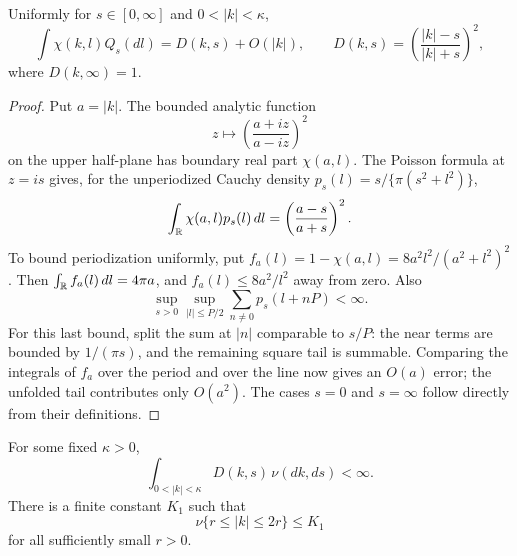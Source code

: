 \begin{lemma}
\label{lem:angular-poisson}
Uniformly for \(s\in[0,\infty]\) and \(0<|k|<\kappa\),
\begin{equation}
 \label{eq:angular-poisson}
 \int\chi(k,l)Q_s(dl)
   =D(k,s)+O(|k|),\qquad
 D(k,s)=\left(\frac{|k|-s}{|k|+s}\right)^2,
\end{equation}
where \(D(k,\infty)=1\).
\end{lemma}

\begin{proof}
Put \(a=|k|\). The bounded analytic function
\[
 z\longmapsto\left(\frac{a+iz}{a-iz}\right)^2
\]
on the upper half-plane has boundary real part \(\chi(a,l)\).
The Poisson formula at \(z=is\) gives, for the unperiodized Cauchy density
\(p_s(l)=s/\{\pi(s^2+l^2)\}\),
\[
 \int_\mathbb R\chi(a,l)p_s(l)\,dl
       =\left(\frac{a-s}{a+s}\right)^2.
\]
To bound periodization uniformly, put
\(f_a(l)=1-\chi(a,l)=8a^2l^2/(a^2+l^2)^2\). Then
\(\int_\mathbb R f_a(l)\,dl=4\pi a\), and
\(f_a(l)\le 8a^2/l^2\) away from zero. Also
\[
 \sup_{s>0}\sup_{|l|\le P/2}\sum_{n\ne0}p_s(l+nP)<\infty.
\]
For this last bound, split the sum at \(|n|\) comparable to \(s/P\): the
near terms are bounded by \(1/(\pi s)\), and the remaining square tail is
summable. Comparing the integrals of \(f_a\) over the period and over the
line now gives an \(O(a)\) error; the unfolded tail contributes only
\(O(a^2)\). The cases \(s=0\) and \(s=\infty\) follow directly from their
definitions.
\end{proof}

\begin{proposition}
\label{prop:dispersion-defect}
For some fixed \(\kappa>0\),
\begin{equation}
 \label{eq:dispersion-defect}
 \int_{0<|k|<\kappa}D(k,s)\,\nu(dk,ds)<\infty.
\end{equation}
There is a finite constant \(K_1\) such that
\begin{equation}
 \label{eq:horizontal-band-mass}
 \nu\{r\le|k|\le2r\}\le K_1
\end{equation}
for all sufficiently small \(r>0\).
\end{proposition}

